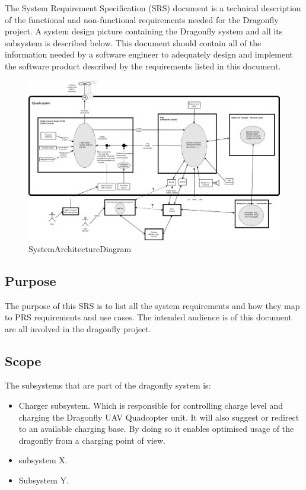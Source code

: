 \documentclass[a4paper]{article}
\begin{document}
The System Requirement Specification (SRS) document is a technical description of the functional and non-functional requirements needed for the Dragonfly project. A system design picture containing the Dragonfly system and all its subsystem is described below. This document should contain all of the information needed by a software engineer to adequately design and implement the software product described by the requirements listed in this document.

\begin{figure}[!h]
	\centering
	\includegraphics[width=\textwidth]{images/SystemArchitectureDiagram_DF.png}
	\caption{SystemArchitectureDiagram}
	\label{fig:sysarchdiag}
\end{figure}

\subsection{Purpose}

The purpose of this SRS is to list all the system requirements and how they map to PRS requirements and use cases. The intended audience is of this document are all involved in the dragonfly project.

\subsection{Scope}

The subsystems that are part of the dragonfly system is:
\begin{itemize}
	\item Charger subsystem. Which is responsible for controlling charge level and charging the Dragonfly UAV Quadcopter unit. It will also suggest or redirect to an available charging base.
	By doing so it enables optimised usage of the dragonfly from a charging point of view.
	\item subsystem X.
	\item Subsystem Y.
\end{itemize}
\end{document}
